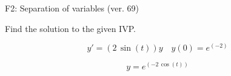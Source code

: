 \begin{exercise}
  \begin{exerciseTitle}F2: Separation of variables (ver. 69)\end{exerciseTitle}
  \begin{exerciseStatement}
    
Find the solution to the given IVP.

    
\[y'=( 2 \, \sin\left(t\right) )y\hspace{1em} y(0)= e^{\left(-2\right)}\]

  \end{exerciseStatement}
  \begin{exerciseAnswer}
    
\[y= e^{\left(-2 \, \cos\left(t\right)\right)}\]

  \end{exerciseAnswer}
\end{exercise}